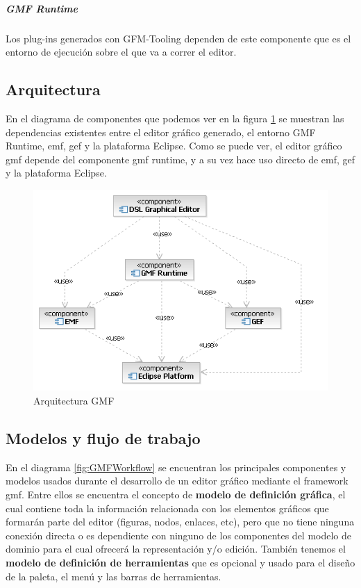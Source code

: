 \documentclass[a4paper,12pt,oneside,spanish]{book}
\begin{document}
\subparagraph{GMF Runtime} Los plug-ins generados con GFM-Tooling dependen de este componente que es el entorno de ejecución sobre el que va a correr el editor.

\subsection{Arquitectura}

En el diagrama de componentes que podemos ver en la figura \ref{fig:GMFArquitectura} se muestran las dependencias existentes entre el editor gráfico generado, el entorno GMF Runtime, \gls{emf}, \gls{gef} y la plataforma Eclipse. Como se puede ver, el editor gráfico \gls{gmf} depende del componente \gls{gmf} runtime, y a su vez hace uso directo de \gls{emf}, \gls{gef} y la plataforma Eclipse.


\begin{figure}[hbtp]
\centering
\includegraphics[scale=.75]{./img/GMFArquitectura}
\caption{Arquitectura GMF}
\label{fig:GMFArquitectura}
\end{figure}


\subsection{Modelos y flujo de trabajo}

En el diagrama \ref{fig:GMFWorkflow} se encuentran los principales componentes y modelos usados durante el desarrollo de un editor gráfico mediante el framework \gls{gmf}. Entre ellos se encuentra el concepto de \textbf{modelo de definición gráfica}, el cual contiene toda la información relacionada con los elementos gráficos que formarán parte del editor (figuras, nodos, enlaces, etc), pero que no tiene ninguna conexión directa o es dependiente con ninguno de los componentes del modelo de dominio para el cual ofrecerá la representación y/o edición. También tenemos el \textbf{modelo de definición de herramientas} que es opcional y usado para el diseño de la paleta, el menú y las barras de herramientas.
\end{document}

